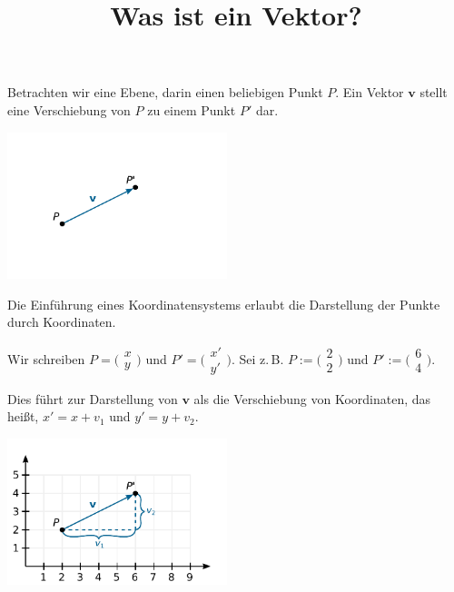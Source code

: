 \documentclass[9pt]{beamer}
\title{Was ist ein Vektor?}
\date{}
\newcommand{\bv}[1]{\mathbf{#1}}
\newcommand{\icol}[1]{
  \big(\!\begin{smallmatrix}#1\end{smallmatrix}\!\big)%
}
\newcommand{\parspace}{\vspace{0.8em}}
\begin{document}
\begin{frame}
\maketitle
\end{frame}

\begin{frame}
Betrachten wir eine Ebene, darin einen beliebigen Punkt $P$. Ein
Vektor $\bv v$ stellt eine Verschiebung von $P$ zu einem Punkt $P'$
dar.\pause

\vspace{-1em}
\begin{center}
\includegraphics[width=64mm]{img/vec-p-pprime.pdf}
\end{center}
\end{frame}

\begin{frame}[t]
\vspace{1em}
Die Einführung eines Koordinatensystems erlaubt die Darstellung der
Punkte durch Koordinaten.

\parspace
Wir schreiben $P=\icol{x\\ y}$ und
$P'=\icol{x'\\ y'}$. Sei z.\,B. $P:=\icol{2\\ 2}$ und $P':=\icol{6\\ 4}$.\pause

\parspace
Dies führt zur Darstellung von $\bv v$ als die Verschiebung von
Koordinaten, das heißt, $x' = x+v_1$ und $y' = y+v_2$.\pause

\vspace{-1em}
\begin{center}
\includegraphics[width=64mm]{img/vec-p-pprime-coord.pdf}
\end{center}
\end{frame}
\end{document}
